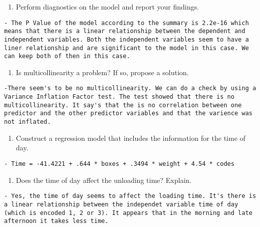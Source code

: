 \documentclass[]{article}
\providecommand{\tightlist}{%
  \setlength{\itemsep}{0pt}\setlength{\parskip}{0pt}}
\begin{document}
\begin{enumerate}
\def\labelenumi{\alph{enumi}.}
\setcounter{enumi}{2}
\tightlist
\item
  Perform diagnostics on the model and report your findings.
\end{enumerate}

\begin{verbatim}
- The P Value of the model according to the summary is 2.2e-16 which means that there is a linear relationship between the dependent and independent variables. Both the independent variables seem to have a liner relationship and are significant to the model in this case. We can keep both of then in this case. 
\end{verbatim}

\begin{enumerate}
\def\labelenumi{\alph{enumi}.}
\setcounter{enumi}{3}
\tightlist
\item
  Is multicollinearity a problem? If so, propose a solution.
\end{enumerate}

\begin{verbatim}
-There seem's to be no multicollinearity. We can do a check by using a Variance Inflation Factor test. The test showed that there is no multicollinearity. It say's that the is no correlation between one predictor and the other predictor variables and that the varience was not inflated. 
\end{verbatim}

\begin{enumerate}
\def\labelenumi{\alph{enumi}.}
\setcounter{enumi}{4}
\tightlist
\item
  Construct a regression model that includes the information for the
  time of day.
\end{enumerate}

\begin{verbatim}
- Time = -41.4221 + .644 * boxes + .3494 * weight + 4.54 * codes
\end{verbatim}

\begin{enumerate}
\def\labelenumi{\alph{enumi}.}
\setcounter{enumi}{5}
\tightlist
\item
  Does the time of day affect the unloading time? Explain.
\end{enumerate}

\begin{verbatim}
- Yes, the time of day seems to affect the loading time. It's there is a linear relationship between the independet variable time of day (which is encoded 1, 2 or 3). It appears that in the morning and late afternoon it takes less time. 
\end{verbatim}
\end{document}
